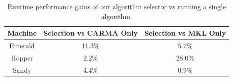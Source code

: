 \begin{table}[t]
    \begin{center}
        \begin{tabular}{c|c|c}
            Machine & Selection vs CARMA Only & Selection vs MKL Only \\ \hline
            Emerald & 11.3\% & 5.7\% \\
            Hopper & 2.2\% & 28.0\% \\
            Sandy & 4.4\% & 0.9\% \\
        \end{tabular}
    \end{center}
    \caption{Runtime performance gains of our algorithm selector vs running a single algorithm.}
    \label{t:improvements}
\end{table}
